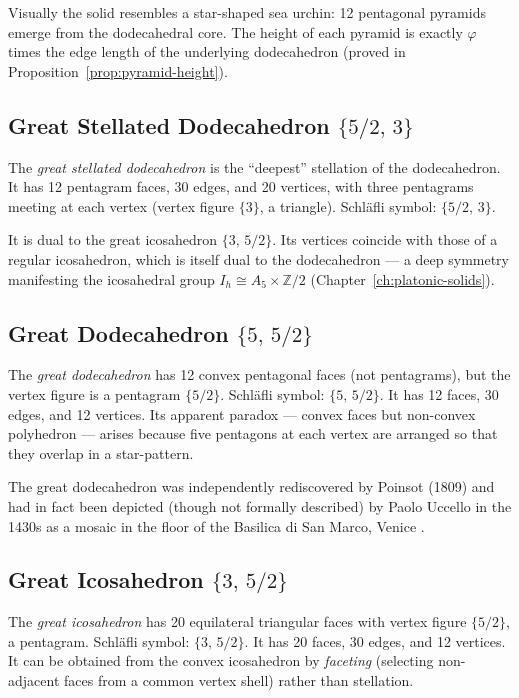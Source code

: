 Visually the solid resembles a star-shaped sea urchin: 12
pentagonal pyramids emerge from the dodecahedral core.  The
height of each pyramid is exactly \(\varphi\) times the edge
length of the underlying dodecahedron (proved in
Proposition~\ref{prop:pyramid-height}).

\subsection{Great Stellated Dodecahedron \texorpdfstring{$\{5/2,\,3\}$}{5/2,3}}
\label{ssec:great-stellated-dodecahedron}

The \emph{great stellated dodecahedron} is the ``deepest''
stellation of the dodecahedron.  It has 12 pentagram faces, 30
edges, and 20 vertices, with three pentagrams meeting at each
vertex (vertex figure \(\{3\}\), a triangle).  Schläfli symbol:
\(\{5/2,\,3\}\).

It is dual to the great icosahedron \(\{3,\,5/2\}\).  Its
vertices coincide with those of a regular icosahedron, which is
itself dual to the dodecahedron — a deep symmetry manifesting
the icosahedral group \(I_h \cong A_5 \times \mathbb{Z}/2\)
(Chapter~\ref{ch:platonic-solids}).

\subsection{Great Dodecahedron \texorpdfstring{$\{5,\,5/2\}$}{5,5/2}}
\label{ssec:great-dodecahedron}

The \emph{great dodecahedron} has 12 convex pentagonal faces
(not pentagrams), but the vertex figure is a pentagram
\(\{5/2\}\).  Schläfli symbol: \(\{5,\,5/2\}\).  It has 12
faces, 30 edges, and 12 vertices.  Its apparent paradox — convex
faces but non-convex polyhedron — arises because five pentagons
at each vertex are arranged so that they overlap in a
star-pattern.

The great dodecahedron was independently rediscovered by Poinsot
(1809) and had in fact been depicted (though not formally
described) by Paolo Uccello in the 1430s as a mosaic in the
floor of the Basilica di San Marco, Venice
\cite{cromwell_polyhedra}.

\subsection{Great Icosahedron \texorpdfstring{$\{3,\,5/2\}$}{3,5/2}}
\label{ssec:great-icosahedron}

The \emph{great icosahedron} has 20 equilateral triangular faces
with vertex figure \(\{5/2\}\), a pentagram.  Schläfli symbol:
\(\{3,\,5/2\}\).  It has 20 faces, 30 edges, and 12 vertices.
It can be obtained from the convex icosahedron by \emph{faceting}
(selecting non-adjacent faces from a common vertex shell) rather
than stellation.

